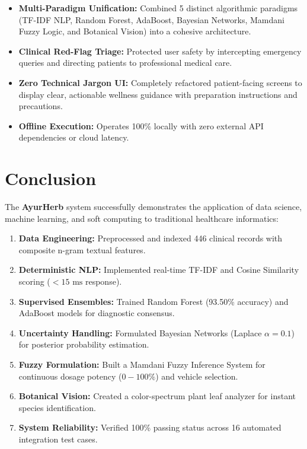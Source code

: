 \documentclass[12pt,a4paper]{article}
\begin{document}
\begin{itemize}
    \item \textbf{Multi-Paradigm Unification:} Combined 5 distinct algorithmic paradigms (TF-IDF NLP, Random Forest, AdaBoost, Bayesian Networks, Mamdani Fuzzy Logic, and Botanical Vision) into a cohesive architecture.
    \item \textbf{Clinical Red-Flag Triage:} Protected user safety by intercepting emergency queries and directing patients to professional medical care.
    \item \textbf{Zero Technical Jargon UI:} Completely refactored patient-facing screens to display clear, actionable wellness guidance with preparation instructions and precautions.
    \item \textbf{Offline Execution:} Operates 100\% locally with zero external API dependencies or cloud latency.
\end{itemize}

\newpage
\section{Conclusion}

The \textbf{AyurHerb} system successfully demonstrates the application of data science, machine learning, and soft computing to traditional healthcare informatics:
\begin{enumerate}
    \item \textbf{Data Engineering:} Preprocessed and indexed 446 clinical records with composite n-gram textual features.
    \item \textbf{Deterministic NLP:} Implemented real-time TF-IDF and Cosine Similarity scoring ($<15\text{ ms}$ response).
    \item \textbf{Supervised Ensembles:} Trained Random Forest (93.50\% accuracy) and AdaBoost models for diagnostic consensus.
    \item \textbf{Uncertainty Handling:} Formulated Bayesian Networks (Laplace $\alpha=0.1$) for posterior probability estimation.
    \item \textbf{Fuzzy Formulation:} Built a Mamdani Fuzzy Inference System for continuous dosage potency ($0-100\%$) and vehicle selection.
    \item \textbf{Botanical Vision:} Created a color-spectrum plant leaf analyzer for instant species identification.
    \item \textbf{System Reliability:} Verified 100\% passing status across 16 automated integration test cases.
\end{enumerate}
\end{document}

